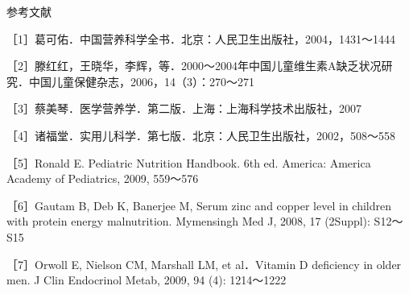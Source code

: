 {参考文献}

［1］葛可佑．中国营养科学全书．北京：人民卫生出版社，2004，1431～1444

［2］滕红红，王晓华，李辉，等．2000～2004年中国儿童维生素A缺乏状况研究．中国儿童保健杂志，2006，14（3）：270～271

［3］蔡美琴．医学营养学．第二版．上海：上海科学技术出版社，2007

［4］诸福堂．实用儿科学．第七版．北京：人民卫生出版社，2002，508～558

［5］Ronald E. Pediatric Nutrition Handbook. 6th ed. America: America
Academy of Pediatrics, 2009, 559～576

［6］Gautam B, Deb K, Banerjee M, Serum zinc and copper level in
children with protein energy malnutrition. Mymensingh Med J, 2008, 17
(2Suppl): S12～S15

［7］Orwoll E, Nielson CM, Marshall LM, et al．Vitamin D deficiency in
older men. J Clin Endocrinol Metab, 2009, 94 (4): 1214～1222

\protect\hypertarget{text00004.html}{}{}

